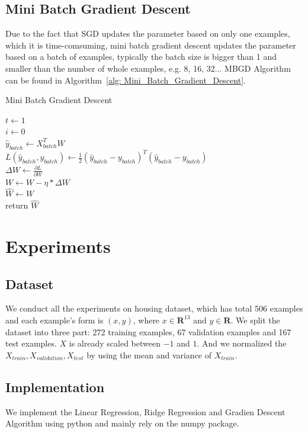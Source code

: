 \documentclass[journal, a4paper]{IEEEtran}
\begin{document}
\subsection{Mini Batch Gradient Descent}
Due to the fact that SGD updates the parameter based on only one examples, which it is time-comsuming, mini batch gradient descent updates the parameter based on a batch of examples, typically the batch size is bigger than 1 and smaller than the number of whole examples, e.g. 8, 16, 32... MBGD Algorithm can be found in Algorithm~\ref{alg: Mini_Batch_Gradient_Descent}.
\begin{algorithm}
	\label{alg: Mini_Batch_Gradient_Descent}
	\caption{Mini Batch Gradient Descent}
	$t \gets 1$ \\
	{
		$ i \gets 0 $ \\
		{
			$\hat{y}_{batch} \gets X^{T}_{batch}W $ \\
			$ L(\hat{y}_{batch}, y_{batch}) \gets \frac{1}{2}(\hat{y}_{batch} - y_{batch})^{T}(\hat{y}_{batch} - y_{batch})$ \\
			$\Delta{W} \gets \frac{\partial L}{\partial W}$ \\
			$W \gets W - \eta * \Delta{W}$ \\
		}
	}
	$\hat{W} \gets W$ \\
	return $\hat{W}$
\end{algorithm}


\section{Experiments}
\subsection{Dataset}
We conduct all the experiments on housing dataset, which has total 506 examples and each example's form is $(x, y)$, where $x \in \mathbf{R}^{13}$ and $y \in \mathbf{R}$. We split the dataset into three part: 272 training examples, 67 validation examples and 167 test examples. $X$ is already scaled between $-1$ and $1$. And we normalized the $X_{train}, X_{validation}, X_{test} $ by using the mean and variance of $X_{train}$. 

\subsection{Implementation}
We implement the Linear Regression, Ridge Regression and Gradien Descent Algorithm using python and mainly rely on the numpy package.
\end{document}

